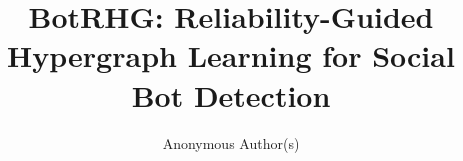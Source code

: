 \documentclass[runningheads]{llncs}
\title{BotRHG: Reliability-Guided Hypergraph Learning for Social Bot Detection}
\author{Anonymous Author(s)}
\institute{Anonymous Institution}
\providecommand{\doi}[1]{DOI:\ \texttt{\detokenize{#1}}}
\renewcommand{\doi}[1]{DOI:\ \texttt{\detokenize{#1}}}
\renewcommand{\url}[1]{}
\providecommand{\urlprefix}{}
\renewcommand{\urlprefix}{}
\begin{document}
\maketitle








\renewcommand{\doi}[1]{DOI:\ \texttt{\detokenize{#1}}}
\renewcommand{\url}[1]{}
\renewcommand{\urlprefix}{}


\end{document}
